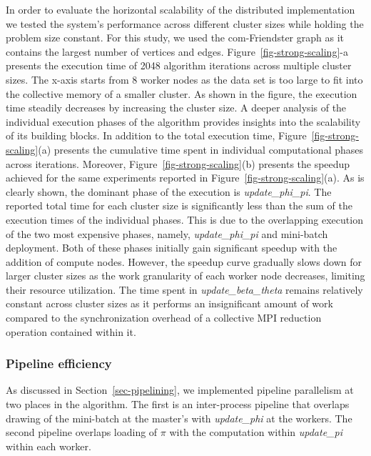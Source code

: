 In order to evaluate the horizontal scalability of the distributed
implementation we tested the system's performance across different cluster
sizes while holding the problem size constant. For this study, we used the
com-Friendster graph as it contains the largest number of vertices and edges.
%
Figure~\ref{fig-strong-scaling}-a presents the execution time of 2048 algorithm
iterations across multiple cluster sizes. The x-axis starts from 8 worker nodes
as the data set is too large to fit into the collective memory of a smaller
cluster.
%
As shown in the figure, the execution
time steadily decreases by increasing the cluster size.
A deeper analysis of the individual execution phases of the algorithm provides
insights into the scalability of its building blocks.
%
In addition to the total execution time, \mbox{Figure~\ref{fig-strong-scaling}(a)}
presents the cumulative time spent in individual computational phases across
iterations. Moreover, \mbox{Figure~\ref{fig-strong-scaling}(b)} presents the speedup
achieved for the same experiments reported in
Figure~\ref{fig-strong-scaling}(a). As is clearly shown, the dominant phase of
the execution is \textit{update\_phi\_pi}.
The reported total time for each cluster size is significantly less than the
sum of the execution times of the individual phases. This is due to the
overlapping execution of the two most expensive phases, namely,
\textit{update\_phi\_pi} and
mini-batch deployment. Both of these phases initially gain significant speedup with the
addition of compute nodes. However, the speedup curve gradually slows down for
larger cluster sizes as the work granularity of each worker node decreases,
limiting their resource utilization.
%
The time spent in \textit{update\_beta\_theta} remains relatively constant across cluster sizes
as it performs an insignificant amount of work compared to the synchronization
overhead of a collective MPI reduction operation contained within it.

\subsubsection{Pipeline efficiency}
\label{eval-pipeline}

As discussed in Section~\ref{sec-pipelining}, we implemented pipeline
parallelism at
two places in the algorithm. The first is an inter-process pipeline that
overlaps drawing of the mini-batch at the master's with \textit{update\_phi}
at the workers. The second pipeline overlaps loading of $\pi$ with the
computation within \textit{update\_pi} within each worker.

